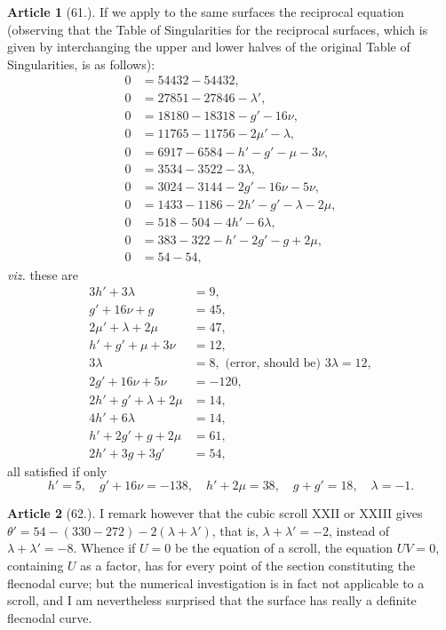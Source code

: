 \documentclass[11pt,a4paper]{article}
\theoremstyle{definition}
\newtheorem{art}{Article}
\begin{document}
\begin{art}[61.]
If we apply to the same surfaces the reciprocal equation (observing that the Table of Singularities for the reciprocal surfaces, which is given by interchanging the upper and lower halves of the original Table of Singularities, is as follows):
\begin{align*}
0 &= 54432 - 54432, \tag{I} \\
0 &= 27851 - 27846 - \lambda', \tag{II} \\
0 &= 18180 - 18318 - g' - 16\nu, \tag{III} \\
0 &= 11765 - 11756 - 2\mu' - \lambda, \tag{IV} \\
0 &= 6917 - 6584 - h' - g' - \mu - 3\nu, \tag{VI} \\
0 &= 3534 - 3522 - 3\lambda, \tag{VIII} \\
0 &= 3024 - 3144 - 2g' - 16\nu - 5\nu, \tag{IX} \\
0 &= 1433 - 1186 - 2h' - g' - \lambda - 2\mu, \tag{XIII} \\
0 &= 518 - 504 - 4h' - 6\lambda, \tag{XVI} \\
0 &= 383 - 322 - h' - 2g' - g + 2\mu, \tag{XVII} \\
0 &= 54 - 54, \tag{XXI}
\end{align*}
\textit{viz.} these are
\begin{align*}
3h' + 3\lambda &= 9, \tag{II} \\
g' + 16\nu + g &= 45, \tag{III} \\
2\mu' + \lambda + 2\mu &= 47, \tag{IV} \\
h' + g' + \mu + 3\nu &= 12, \tag{VI} \\
3\lambda &= 8, \text{ (error, should be) } 3\lambda = 12, \tag{VIII} \\
2g' + 16\nu + 5\nu &= -120, \tag{IX} \\
2h' + g' + \lambda + 2\mu &= 14, \tag{XIII} \\
4h' + 6\lambda &= 14, \tag{XVI} \\
h' + 2g' + g + 2\mu &= 61, \tag{XVII} \\
2h' + 3g + 3g' &= 54, \tag{XXI}
\end{align*}
all satisfied if only
\[
h' = 5, \quad g' + 16\nu = -138, \quad h' + 2\mu = 38, \quad g + g' = 18, \quad \lambda = -1.
\]
\end{art}

\begin{art}[62.]
I remark however that the cubic scroll XXII or XXIII gives $\theta' = 54 - (330 - 272) - 2(\lambda + \lambda')$, that is, $\lambda + \lambda' = -2$, instead of $\lambda + \lambda' = -8$. Whence if $U = 0$ be the equation of a scroll, the equation $UV = 0$, containing $U$ as a factor, has for every point of the section constituting the flecnodal curve; but the numerical investigation is in fact not applicable to a scroll, and I am nevertheless surprised that the surface has really a definite flecnodal curve.
\end{art}
\end{document}
